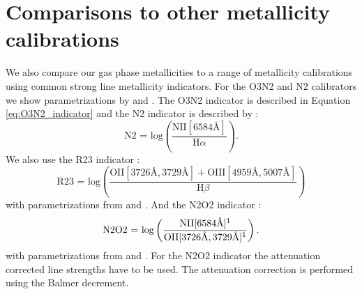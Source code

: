 \documentclass[fleqn,usenatbib]{mnras}
\begin{document}








\appendix

\section{Comparisons to other metallicity calibrations}
\label{sec:appendix_metallicities}

We also compare our gas phase metallicities to a range of metallicity calibrations using common strong line metallicity indicators. For the O3N2 and N2 calibrators we show parametrizations by \cite{pettini2004, nagao2006, maiolino2008, marino2013, brown2016} and \cite{curti2017}. The O3N2 indicator is described in Equation \ref{eq:O3N2_indicator} and the N2 indicator is described by \citep{storchi-bergmann1994}:
\begin{equation}
    \textrm{N2 = log}\left(\frac{\textrm{NII} [6584\textrm{\AA}]}{\textrm{H}\alpha}\right).
\end{equation}
We also use the R23 indicator \citep{pagel1979}:
\begin{equation}
    \textrm{R23 = log}\left(\frac{\textrm{OII} [3726\textrm{\AA}, 3729\textrm{\AA}] + \textrm{OIII} [4959\textrm{\AA}, 5007\textrm{\AA}]}{\textrm{H}\beta}\right)
\end{equation}
with parametrizations from \cite{mcgaugh1991, zaritsky1994, nagao2006, maiolino2008} and \cite{curti2017}. And the N2O2 indicator \citep{alloin1979}:
\begin{equation}
    \textrm{N2O2 = log}\left(\frac{\textrm{NII} [6584\textrm{\AA}]\textrm{\footnotemark[1]}}{\textrm{OII} [3726\textrm{\AA}, 3729\textrm{\AA}]\textrm{\footnotemark[1]}}\right).
\end{equation}
with parametrizations from \cite{kewley2002, nagao2006} and \cite{brown2016}. For the N2O2 indicator the attenuation corrected line strengths have to be used. The attenuation correction is performed using the Balmer decrement. 
\end{document}
